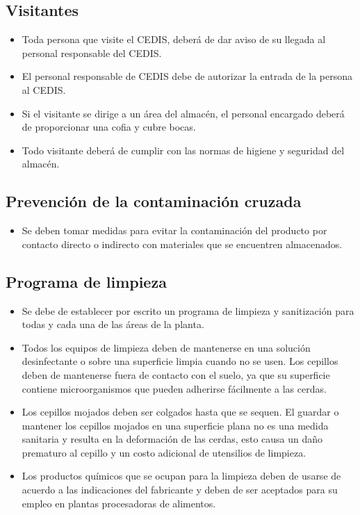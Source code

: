\subsection{Visitantes}

\begin{itemize}
	\item Toda persona que visite el CEDIS, deberá de dar aviso de su llegada al personal responsable del CEDIS.
	\item El personal responsable de CEDIS debe de autorizar la entrada de la persona al CEDIS.
	\item Si el visitante se dirige a un área del almacén, el personal encargado deberá de proporcionar una cofia y cubre bocas.
	\item Todo visitante deberá de cumplir con las normas de higiene y seguridad del almacén.
\end{itemize}

\subsection{Prevención de la contaminación cruzada}

\begin{itemize}
	\item Se deben tomar medidas para evitar la contaminación del producto por contacto directo o indirecto con materiales que se encuentren almacenados.
\end{itemize}

\subsection{Programa de limpieza}

\begin{itemize}
	\item Se debe de establecer por escrito un programa de limpieza y sanitización para todas y cada una de las áreas de la planta.
	\item Todos los equipos de limpieza deben de mantenerse en una solución desinfectante o sobre una superficie limpia cuando no se usen. Los cepillos deben de mantenerse fuera de contacto con el suelo, ya que su superficie contiene microorganismos que pueden adherirse fácilmente a las cerdas.
	\item Los cepillos mojados deben ser colgados hasta que se sequen. El guardar o mantener los cepillos mojados en una superficie plana no es una medida sanitaria y resulta en la deformación de las cerdas, esto causa un daño prematuro al cepillo y un costo adicional de utensilios de limpieza.
	\item Los productos químicos que se ocupan para la limpieza deben de usarse de acuerdo a las indicaciones del fabricante y deben de ser aceptados para su empleo en plantas procesadoras de alimentos.
\end{itemize}

